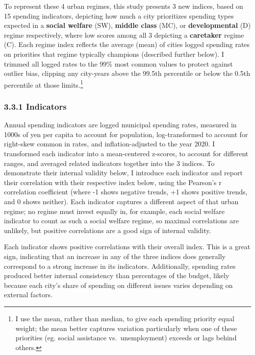 \documentclass[preprint, 3p,
authoryear]{elsarticle} %
\begin{document}
To represent these 4 urban regimes, this study presents 3 new indices,
based on 15 spending indicators, depicting how much a city prioritizes
spending types expected in a \textbf{social welfare} (SW),
\textbf{middle class} (MC), or \textbf{developmental} (D) regime
respectively, where low scores among all 3 depicting a
\textbf{caretaker} regime (C). Each regime index reflects the average
(mean) of cities logged spending rates on priorities that regime
typically champions (described further below). I trimmed all logged
rates to the 99\% most common values to protect against outlier bias,
clipping any city-years above the 99.5th percentile or below the 0.5th
percentile at those limits.\footnote{I use the mean, rather than median,
  to give each spending priority equal weight; the mean better captures
  variation particularly when one of these priorities (eg. social
  assistance vs.~unemployment) exceeds or lags behind others.}

\hypertarget{indicators}{%
\subsubsection{3.3.1 Indicators}\label{indicators}}

Annual spending indicators are logged municipal spending rates, measured
in 1000s of yen per capita to account for population, log-transformed to
account for right-skew common in rates, and inflation-adjusted to the
year 2020. I transformed each indicator into a mean-centered z-scores,
to account for different ranges, and averaged related indicators
together into the 3 indices. To demonstrate their internal validity
below, I introduce each indicator and report their correlation with
their respective index below, using the Pearson's r correlation
coefficient (where -1 shows negative trends, +1 shows positive trends,
and 0 shows neither). Each indicator captures a different aspect of that
urban regime; no regime must invest equally in, for example, each social
welfare indicator to count as such a social welfare regime, so maximal
correlations are unlikely, but positive correlations are a good sign of
internal validity.

Each indicator shows positive correlations with their overall index.
This is a great sign, indicating that an increase in any of the three
indices does generally correspond to a strong increase in its
indicators. Additionally, spending rates produced better internal
consistency than percentages of the budget, likely because each city's
share of spending on different issues varies depending on external
factors.
\end{document}
